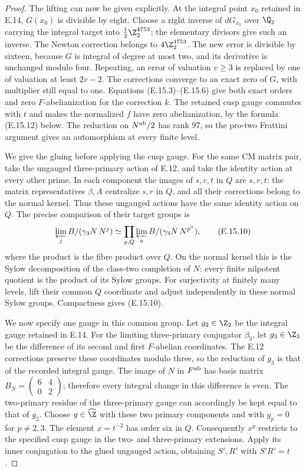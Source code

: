 \begin{proof}
The lifting can now be given explicitly. At the integral
point $x_0$ retained in E.14, $G(x_0)$ is divisible
by eight. Choose a right inverse of $dG_{x_0}$ over
$\Q_2$ carrying the integral target into
$\frac12\Z_2^{4753}$; the elementary divisors give
such an inverse. The Newton correction belongs to
$4\Z_2^{4753}$. The new error is divisible by sixteen,
because $G$ is integral of degree at most two, and its
derivative is unchanged modulo four. Repeating, an
error of valuation $v\geq3$ is replaced by one of
valuation at least $2v-2$. The corrections converge to
an exact zero of $G$, with multiplier still equal to one.
Equations (E.15.3)--(E.15.6) give both exact orders
and zero $F$-abelianization for the correction $k$.
The retained cusp gauge commutes with $t$ and makes
the normalized $f$ have zero abelianization, by the
formula (E.15.12) below. The reduction on $N^{\rm ab}/2$ has
rank 97, so the pro-two Frattini argument gives an
automorphism at every finite level.

We give the gluing before applying the cusp gauge.
For the same CM matrix pair, take the ungauged
three-primary action of E.12, and take the identity
action at every other prime. In each component the
images of $s,r,t$ in $Q$ are $s,r,t$: the matrix
representatives $\beta,A$ centralize $s,r$ in $Q$,
and all their corrections belong to the normal kernel.
Thus these ungauged actions have the same identity
action on $Q$. The precise comparison of their target
groups is
\[
 \varprojlim_j B/(\gamma_3N\,N^j)
 \simeq
 \prod_{p,Q}\varprojlim_a B/(\gamma_3N\,N^{p^a}),
 \tag{E.15.10}
\]
where the product is the fibre product over $Q$.
On the normal kernel this is the Sylow decomposition
of the class-two completion of $N$: every finite
nilpotent quotient is the product of its Sylow groups.
For surjectivity at finitely many levels, lift their
common $Q$ coordinate and adjust independently in
these normal Sylow groups. Compactness gives (E.15.10).

We now specify one gauge in this common group. Let
$g_2\in\Z_2$ be the integral gauge retained in E.14.
For the limiting three-primary conjugator $\beta_3$,
let $g_3\in\Z_3$ be the difference of its second and
first $F$-abelian coordinates. The E.12 corrections
preserve these coordinates modulo three, so the
reduction of $g_3$ is that of the recorded integral
gauge. The image of $N$ in $F^{\rm ab}$ has basis matrix
$B_N=\left(\begin{smallmatrix}6&4\\0&2\end{smallmatrix}\right)$;
therefore every integral change in this difference is
even. The two-primary residue of the three-primary
gauge can accordingly be kept equal to that of $g_2$.
Choose $g\in\widehat\Z$ with these two primary
components and with $g_p=0$ for $p\ne2,3$.
The element $x=t^{-2}$ has order six in $Q$.
Consequently $x^g$ restricts to the specified cusp
gauge in the two- and three-primary extensions.
Apply its inner conjugation to the glued ungauged
action, obtaining $S',R'$ with $S'R'=t$.


\end{proof}
